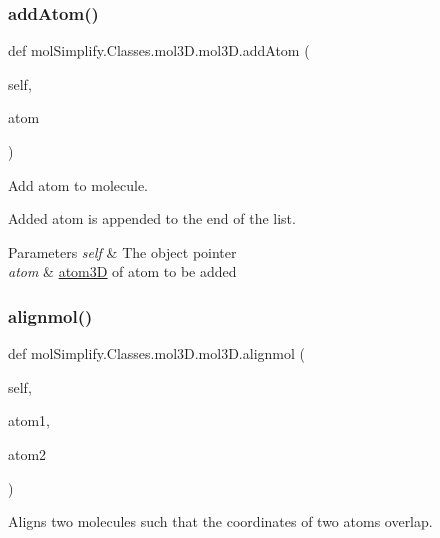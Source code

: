 \subsubsection{\texorpdfstring{add\+Atom()}{addAtom()}}
{\footnotesize\ttfamily def mol\+Simplify.\+Classes.\+mol3\+D.\+mol3\+D.\+add\+Atom (\begin{DoxyParamCaption}\item[{}]{self,  }\item[{}]{atom }\end{DoxyParamCaption})}



Add atom to molecule. 

Added atom is appended to the end of the list. 
\begin{DoxyParams}{Parameters}
{\em self} & The object pointer \\
\hline
{\em atom} & \hyperlink{namespacemolSimplify_1_1Classes_1_1atom3D}{atom3D} of atom to be added \\
\hline
\end{DoxyParams}
\mbox{\label{classmolSimplify_1_1Classes_1_1mol3D_1_1mol3D_ab1d82358efa2110c56e1caf3ba9433e5}} 
\subsubsection{\texorpdfstring{alignmol()}{alignmol()}}
{\footnotesize\ttfamily def mol\+Simplify.\+Classes.\+mol3\+D.\+mol3\+D.\+alignmol (\begin{DoxyParamCaption}\item[{}]{self,  }\item[{}]{atom1,  }\item[{}]{atom2 }\end{DoxyParamCaption})}



Aligns two molecules such that the coordinates of two atoms overlap. 


